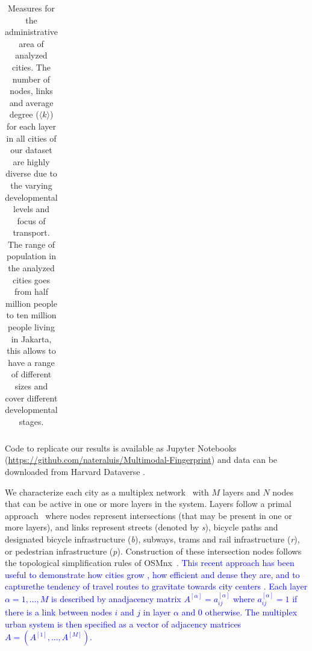 \begin{table}[ht!]
\begin{adjustbox}{width=\textwidth,keepaspectratio}
\begin{tabular}{l|rrr|rrr|rrr|rrr|r}
		\end{tabular}
	\end{adjustbox}
	\caption[Layers measures for analyzed cities]{Measures for the administrative area of analyzed cities. The number of nodes, links and average degree ($\langle k \rangle$) for each layer in all cities of our dataset are highly diverse due to the varying developmental levels and focus of transport. The range of population in the analyzed cities goes from half million people to ten million people living in Jakarta, this allows to
		have a range of different sizes and cover different developmental stages.
		\label{tab:MultiplexCities}}
\end{table}

Code to replicate our results is available as Jupyter Notebooks (\url{https://github.com/nateraluis/Multimodal-Fingerprint}) and data can be downloaded from Harvard Dataverse \cite{natera2019data}.

We characterize each city as a multiplex network~\cite{Boccaletti2014Structure,Kivela2014Multilayer,Battiston2017Challenges} with $M$ layers and $N$ nodes that can be active in one or more layers in the system. Layers follow a primal approach~\cite{Porta2006Primal} where nodes represent intersections (that may be present in one or more layers), and links represent streets (denoted by \textit{s}), bicycle paths and designated bicycle infrastructure (\textit{b}), subways, trams and rail infrastructure (\textit{r}), or pedestrian infrastructure (\textit{p}). Construction of these intersection nodes follows the topological simplification rules of OSMnx~\cite{Boeing2017OSMNX}. \textcolor{blue}{ This recent approach has been useful to demonstrate how cities grow \cite{Strano2012Evolution,Barthelemy2013Evolution}, how efficient \cite{Gallotti2014Efficiency} and dense they are, and to capturethe tendency of travel routes to gravitate towards city centers \cite{Lee2017Morphology}. Each layer $\alpha = 1,\dots, M$ is described by anadjacency matrix $A^{[\alpha]} = {a^{[\alpha]}_{ij}}$ where $a^{[\alpha]}_{ij} = 1$ if there is a link between nodes $i$ and $j$ in layer $\alpha$ and 0 otherwise. The multiplex urban system is then specified as a vector of adjacency matrices $A = (A^{[1]},\dots,A^{[M]})$.}

